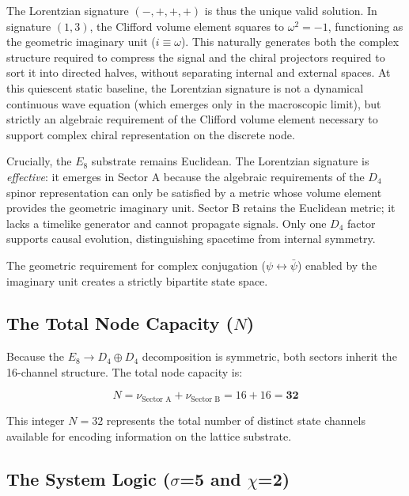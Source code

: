 The Lorentzian signature $(-,+,+,+)$ is thus the unique valid solution. In signature $(1,3)$, the Clifford volume element squares to $\omega^2 = -1$, functioning as the geometric imaginary unit ($i \equiv \omega$). This naturally generates both the complex structure required to compress the signal and the chiral projectors required to sort it into directed halves, without separating internal and external spaces. At this quiescent static baseline, the Lorentzian signature is not a dynamical continuous wave equation (which emerges only in the macroscopic limit), but strictly an algebraic requirement of the Clifford volume element necessary to support complex chiral representation on the discrete node.

Crucially, the $E_8$ substrate remains Euclidean. The Lorentzian signature is \emph{effective}: it emerges in Sector A because the algebraic requirements of the $D_4$ spinor representation can only be satisfied by a metric whose volume element provides the geometric imaginary unit. Sector B retains the Euclidean metric; it lacks a timelike generator and cannot propagate signals. Only one $D_4$ factor supports causal evolution, distinguishing spacetime from internal symmetry.

The geometric requirement for complex conjugation ($\psi \leftrightarrow \bar{\psi}$) enabled by the imaginary unit creates a strictly bipartite state space.


\subsection{The Total Node Capacity (\texorpdfstring{$N$}{N})}
\label{sec:total_node_capacity}
Because the $E_8 \to D_4 \oplus D_4$ decomposition is symmetric, both sectors inherit the 16-channel structure. The total node capacity is:

\begin{equation}
    N = \nu_{\text{Sector A}} + \nu_{\text{Sector B}} = 16 + 16 = \mathbf{32}
\end{equation}

This integer $N = 32$ represents the total number of distinct state channels available for encoding information on the lattice substrate.

\subsection{The System Logic (\texorpdfstring{$\sigma$=5}{sigma=5} and \texorpdfstring{$\chi$=2}{chi=2})}
\label{sec:the_system_logic}

